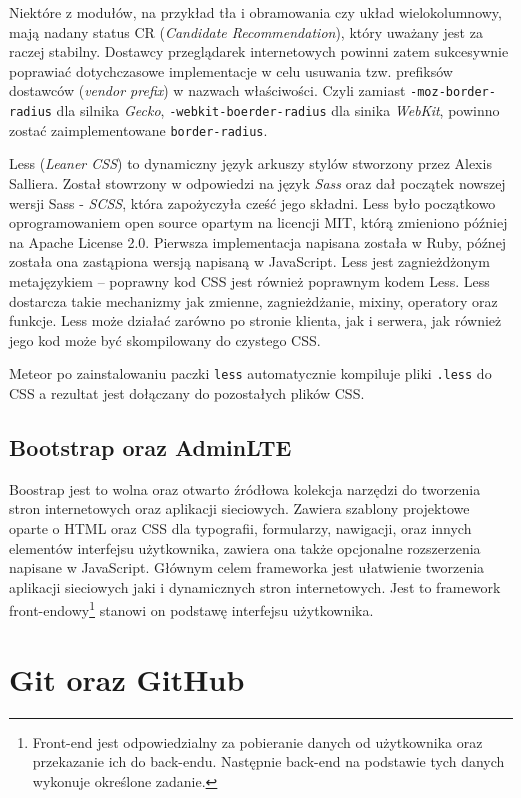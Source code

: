 Niektóre z modułów, na przykład tła i obramowania czy układ wielokolumnowy, mają nadany status CR (\textit{Candidate Recommendation}), który uważany jest za raczej stabilny. Dostawcy przeglądarek internetowych powinni zatem sukcesywnie poprawiać dotychczasowe implementacje w celu usuwania tzw. prefiksów dostawców (\textit{vendor prefix}) w nazwach właściwości. Czyli zamiast \verb|-moz-border-radius| dla silnika \emph{Gecko}, \verb|-webkit-boerder-radius| dla sinika \emph{WebKit}, powinno zostać zaimplementowane \verb|border-radius|.

Less (\emph{Leaner CSS}) to dynamiczny język arkuszy stylów stworzony przez Alexis Salliera. Został stowrzony w odpowiedzi na język \emph{Sass} oraz dał początek nowszej wersji Sass - \emph{SCSS}, która zapożyczyła cześć jego składni. Less było początkowo oprogramowaniem open source opartym na licencji MIT, którą zmieniono później na Apache License 2.0. Pierwsza implementacja napisana została w Ruby, późnej została ona zastąpiona wersją napisaną w JavaScript. Less jest zagnieżdżonym metajęzykiem -- poprawny kod CSS jest również poprawnym kodem Less. Less dostarcza takie mechanizmy jak zmienne, zagnieżdżanie, mixiny, operatory oraz funkcje. Less może działać zarówno po stronie klienta, jak i serwera, jak również jego kod może być skompilowany do czystego CSS. 

Meteor po zainstalowaniu paczki \verb|less| automatycznie kompiluje pliki \verb|.less| do CSS a rezultat jest dołączany do pozostałych plików CSS.

\subsection{Bootstrap oraz AdminLTE}

Boostrap jest to wolna oraz otwarto źródłowa kolekcja narzędzi do tworzenia stron internetowych oraz aplikacji sieciowych. Zawiera szablony projektowe oparte o HTML oraz CSS dla typografii, formularzy, nawigacji, oraz innych elementów interfejsu użytkownika, zawiera ona także opcjonalne rozszerzenia napisane w JavaScript. Głównym celem frameworka jest ułatwienie tworzenia aplikacji sieciowych jaki i  dynamicznych stron internetowych. Jest to framework front-endowy\footnote{Front-end jest odpowiedzialny za pobieranie danych od użytkownika oraz przekazanie ich do back-endu. Następnie back-end na podstawie tych danych wykonuje określone zadanie.} stanowi on podstawę interfejsu użytkownika\cite{bsWiki}.

\section{Git oraz GitHub}


